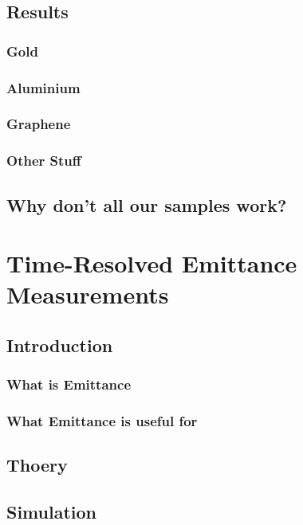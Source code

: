 \section{Results}

\subsection{Gold}

\subsection{Aluminium}

\subsection{Graphene}

\subsection{Other Stuff}

\section{Why don't all our samples work?}



\chapter{Time-Resolved Emittance Measurements}

\section{Introduction}

\subsection{What is Emittance}

\subsection{What Emittance is useful for}

\section{Thoery}

\section{Simulation}

